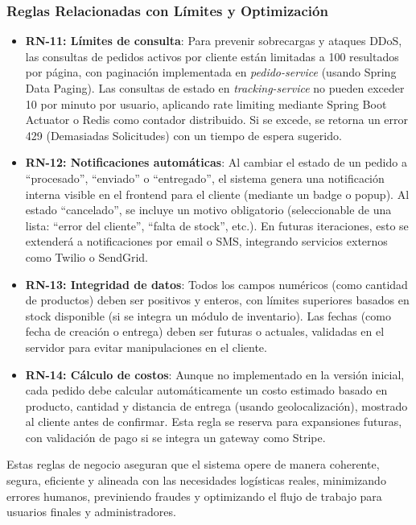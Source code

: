 \documentclass[a4paper,12pt]{article}
\begin{document}
\subsubsection{Reglas Relacionadas con Límites y Optimización}
\begin{itemize}
    \item \textbf{RN-11: Límites de consulta}: Para prevenir sobrecargas y ataques DDoS, las consultas de pedidos activos por cliente están limitadas a 100 resultados por página, con paginación implementada en \textit{pedido-service} (usando Spring Data Paging). Las consultas de estado en \textit{tracking-service} no pueden exceder 10 por minuto por usuario, aplicando rate limiting mediante Spring Boot Actuator o Redis como contador distribuido. Si se excede, se retorna un error 429 (Demasiadas Solicitudes) con un tiempo de espera sugerido.
    
    \item \textbf{RN-12: Notificaciones automáticas}: Al cambiar el estado de un pedido a ``procesado'', ``enviado'' o ``entregado'', el sistema genera una notificación interna visible en el frontend para el cliente (mediante un badge o popup). Al estado ``cancelado'', se incluye un motivo obligatorio (seleccionable de una lista: ``error del cliente'', ``falta de stock'', etc.). En futuras iteraciones, esto se extenderá a notificaciones por email o SMS, integrando servicios externos como Twilio o SendGrid.
    
    \item \textbf{RN-13: Integridad de datos}: Todos los campos numéricos (como cantidad de productos) deben ser positivos y enteros, con límites superiores basados en stock disponible (si se integra un módulo de inventario). Las fechas (como fecha de creación o entrega) deben ser futuras o actuales, validadas en el servidor para evitar manipulaciones en el cliente.
    
    \item \textbf{RN-14: Cálculo de costos}: Aunque no implementado en la versión inicial, cada pedido debe calcular automáticamente un costo estimado basado en producto, cantidad y distancia de entrega (usando geolocalización), mostrado al cliente antes de confirmar. Esta regla se reserva para expansiones futuras, con validación de pago si se integra un gateway como Stripe.
\end{itemize}

Estas reglas de negocio aseguran que el sistema opere de manera coherente, segura, eficiente y alineada con las necesidades logísticas reales, minimizando errores humanos, previniendo fraudes y optimizando el flujo de trabajo para usuarios finales y administradores.
\end{document}
